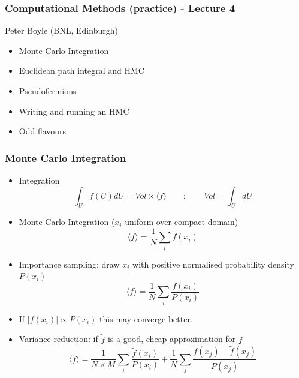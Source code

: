 \documentclass[pdf,ps,8pt]{beamer}
\begin{document}
\begin{frame}[fragile]\small\frametitle{  Computational Methods (practice) -  Lecture 4    }

  \begin{center}
 
  {\color{red} Peter Boyle} (BNL, Edinburgh)

  \begin{itemize}
  \item Monte Carlo Integration
  \item Euclidean path integral and HMC
  \item Pseudofermions
  \item Writing and running an HMC
  \item Odd flavours
  \end{itemize}

\end{center}  
\end{frame}

\begin{frame}[fragile]\small\frametitle{Monte Carlo Integration}
\begin{itemize}
\item Integration
  $$
  \int_U f(U) dU =  Vol \times \langle f \rangle  \quad \quad ; \quad \quad Vol = \int_U dU
  $$
\item Monte Carlo Integration ($x_i$ uniform over compact domain)
  $$
  \langle f \rangle = \frac{1}{N}\sum\limits_i f(x_i)
  $$
\item Importance sampling: draw $x_i$ with positive normalised probability density $P(x_i)$
  $$
  \langle f \rangle = \frac{1}{N}\sum\limits_i \frac{f(x_i)}{P(x_i)}
  $$
\item If $|f(x_i)| \propto P(x_i)$ this may converge better.

\item Variance reduction: if $\tilde{f}$ is a good, cheap approximation for $f$
  $$
  \langle f \rangle = \frac{1}{N\times M}\sum\limits_i \frac{\tilde{f}(x_i)}{P(x_i)}
                    + \frac{1}{N}\sum\limits_j \frac{f(x_j) - \tilde{f}(x_j)}{P(x_j)}
  $$
\end{itemize}
\end{frame}
\end{document}
